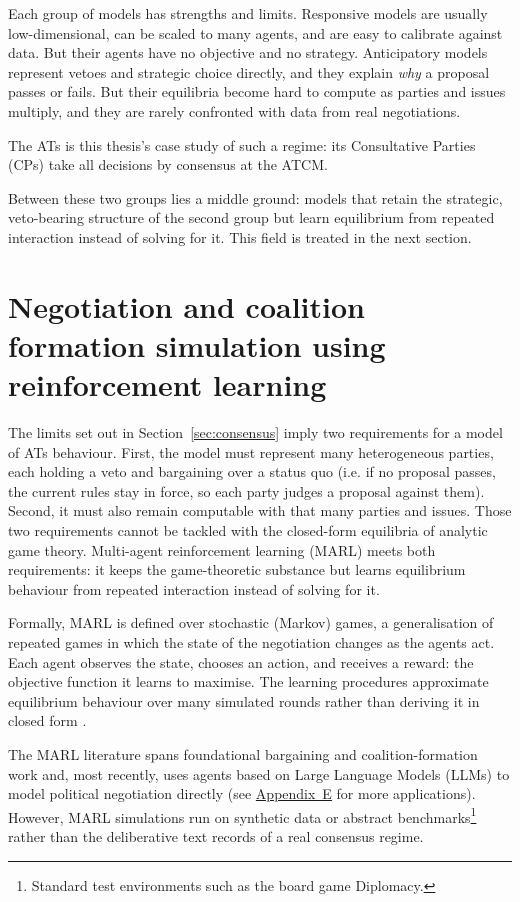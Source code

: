 Each group of models has strengths and limits. Responsive models are usually low-dimensional, can be scaled to many agents,
and are easy to calibrate against data. But their agents have no objective and no
strategy. Anticipatory models represent vetoes and strategic choice directly, and they explain \emph{why} a proposal passes or
fails. But their equilibria become hard to compute as parties and issues multiply, and they are
rarely confronted with data from real negotiations.

The ATs is this thesis's case study of such a regime: its Consultative Parties (CPs) take all
decisions by consensus at the ATCM.

Between these two groups lies a middle ground: models that retain the strategic, veto-bearing
structure of the second group but learn equilibrium from repeated interaction instead of solving
for it. This field is treated in the next section.


\section{Negotiation and coalition formation simulation using reinforcement learning}
\label{sec:marl}

The limits set out in Section~\ref{sec:consensus} imply two requirements for a model of ATs behaviour. 
First, the model must represent many heterogeneous parties, each holding a veto and bargaining over a status quo (i.e.
if no proposal passes, the current rules stay in force, so each party judges a proposal against them). Second, it
must also remain computable with that many parties and issues. Those two requirements cannot be tackled with the closed-form
 equilibria of analytic game theory. Multi-agent reinforcement learning (MARL) meets both requirements: it keeps the
game-theoretic substance but learns equilibrium behaviour from repeated interaction instead of
solving for it.

Formally, MARL is defined over stochastic (Markov) games, a generalisation of repeated games in
which the state of the negotiation changes as the agents act. Each agent observes the state,
chooses an action, and receives a reward: the objective function it learns to maximise. The
learning procedures approximate equilibrium behaviour over many simulated rounds rather than
deriving it in closed form \parencite{Littman1994}.

The MARL literature spans foundational bargaining and coalition-formation work
\parencite{Gronauer2022,Sarkar2022} and, most recently, \textcite{Kulkarni2025} uses agents based on Large Language Models
(LLMs) to model political negotiation directly (see \hyperref[app:e]{Appendix~E} for more applications). However, MARL simulations run on
synthetic data or abstract benchmarks\footnote{Standard test environments such as the board game
Diplomacy.} \parencite{Bolleddu2025} rather than the deliberative text records of a real consensus
regime.



